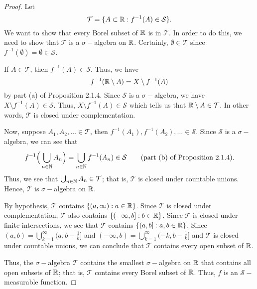 \documentclass[11pt,a4paper]{book}
\begin{document}
\begin{proof}
    Let 
    \[  \mathcal{T} = \{ A \subset \mathbb{R} : f^{-1}(A) \in \mathcal{S} \}. \]
    We want to show that every Borel subset of \( \mathbb{R}  \) is in \( \mathcal{T} \). In order to do this, we need to show that \( \mathcal{T} \) is a \( \sigma- \)algebra on \( \mathbb{R}  \).
    Certainly, \( \emptyset \in \mathcal{T}  \) since \( f^{-1}(\emptyset) = \emptyset \in \mathcal{S} \).  

    If \( A \in \mathcal{T} \), then \( f^{-1}(A) \in \mathcal{S} \). Thus, we have
    \[  f^{-1}(\mathbb{R} \setminus  A ) = X \setminus  f^{-1}(A) \]
    by part (a) of Proposition 2.1.4. Since \( \mathcal{S} \) is a \( \sigma- \)algebra, we have \( X \setminus  f^{-1}(A) \in \mathcal{S}  \). Thus, \(  X \setminus f^{-1} ( A) \in \mathcal{S} \) which tells us that \( \mathbb{R} \setminus A \in \mathcal{T}    \). In other words, \( \mathcal{T} \) is closed under complementation. 

    Now, suppose \( {A}_{1}, {A}_{2}, \dots \in \mathcal{T}  \), then \( f^{-1}({A}_{1}), f^{-1}({A}_{2}), \dots \in \mathcal{S} \). Since \( \mathcal{S}  \) is a \( \sigma- \)algebra, we can see that 
    \[  f^{-1} \Big( \bigcup_{ n \in \mathbb{N}  }^{  } {A}_{n } \Big) =    \bigcup_{ n \in \mathbb{N}  }^{  } f^{-1}  ({A}_{n}  ) \in \mathcal{S} \tag{part (b) of Proposition 2.1.4}.      \]
    Thus, we see that \( \bigcup_{ n \in \mathbb{N} }^{} {A}_{n } \in \mathcal{T} \); that is, \( \mathcal{T} \) is closed under countable unions. Hence, \( \mathcal{T} \) is \( \sigma- \)algebra on \( \mathbb{R}  \).
   
    By hypothesis, \( \mathcal{T} \) contains \( \{ (a, \infty ) : a \in \mathbb{R}  \}  \). Since \( \mathcal{T }  \) is closed under complementation, \( \mathcal{T} \) also contains \( \{ (-\infty, b ] : b \in \mathbb{R}  \}  \). Since \( \mathcal{T}  \) is closed under finite intersections, we see that \( \mathcal{T} \) contains \( \{ (a,b] : a,b  \in \mathbb{R} \}  \). Since \( (a,b) = \bigcup_{ k =1  }^{ \infty  } (a,b - \frac{ 1 }{ k  } ] \) and \( (-\infty, b ) = \bigcup_{ k = 1  }^{ \infty  }  (-k, b - \frac{ 1 }{ k  } ] \) and \( \mathcal{T} \) is closed under countable unions, we can conclude that \( \mathcal{T} \) contains every open subset of \( \mathbb{R}  \).

    Thus, the \( \sigma- \)algebra \( \mathcal{T} \) contains the smallest \( \sigma- \)algebra on \( \mathbb{R}  \) that contains all open subsets of \( \mathbb{R}  \); that is, \( \mathcal{T} \) contains every Borel subset of \( \mathbb{R}  \). Thus, \( f  \) is an \( \mathcal{S}- \)measurable function.
\end{proof}
\end{document}
